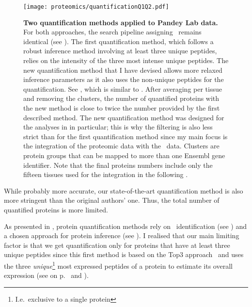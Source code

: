\begin{figure}[!htbp]
    \texttt{[image: proteomics/quantificationQ1Q2.pdf]}\centering
    \caption[Two quantification methods for Pandey Lab data]{\label{fig:newQuantProtMeth}\textbf{Two
    quantification methods applied to Pandey Lab data.}
    For both approaches, the search pipeline assigning \psms\ remains identical
    (see ).
    The first quantification method,
    which follows a robust inference method
    involving at least three unique peptides,
    relies on the intensity of the three most intense unique peptides.
    The new quantification method that I have devised
    allows more relaxed inference parameters
    as it also uses the non-unique peptides for the quantification.
    See ,
    which is similar to .
    After averaging per tissue and removing the clusters,
    the number of quantified proteins with the new method
    is close to twice the number provided by the first described method.
    The new quantification method was designed
    for the analyses in  in particular;
    this is why the filtering is also less strict than for the first quantification method
    since my main focus is the integration of the proteomic data
    with the \Rnaseq\ data.
    Clusters are protein groups that can be mapped to
    more than one \gls{Ensembl} gene identifier.
    Note that the final proteins numbers include only the fifteen tissues
    used for the integration in the following .
    }
\end{figure}

While probably more accurate,
our state-of-the-art quantification method is also
more stringent than the original authors' one.
Thus, the total number of quantified proteins is more limited.\mybr\

As presented in ,
protein quantification methods rely on
\psms\ identification (see )
and a chosen approach for protein inference (see ).
I realised that our main limiting factor is that
we get quantification only for proteins
that have at least three unique peptides
since this first method is based on the Top3 approach~
and uses the three \emph{unique}\footnote{I.e.\ exclusive to a single protein}
most expressed peptides of a protein to estimate its overall expression
(see  on p.~\pageref{eq:Top3} and ).\mybr\

